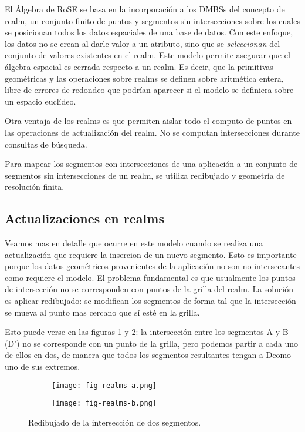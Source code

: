 El Álgebra de RoSE se basa en la incorporación a los DMBSs del concepto de realm, un conjunto finito de puntos y segmentos sin intersecciones
sobre los cuales se posicionan todos los datos espaciales de una base de datos.
Con este enfoque, los datos no se crean al darle valor a un atributo, sino que se \emph{seleccionan} del conjunto de
valores existentes en el realm.
Este modelo permite asegurar que el álgebra espacial es cerrada respecto a un realm.
Es decir, que la primitivas geométricas y las operaciones sobre realms se definen sobre
aritmética entera, libre de errores de redondeo que podrían aparecer si el modelo se definiera sobre un espacio euclídeo.

Otra ventaja de los realms es que permiten aislar todo el computo de puntos en las operaciones de actualización del realm.
No se computan intersecciones durante consultas de búsqueda.

Para mapear los segmentos con intersecciones de una aplicación a un conjunto de segmentos sin intersecciones de un realm,
se utiliza redibujado y geometría de resolución finita\textsuperscript{\cite{finite:resolution}}.

\subsection{Actualizaciones en realms} \label{realms:2}

Veamos mas en detalle que ocurre en este modelo cuando se realiza una actualización que requiere la insercion de un nuevo segmento.
Esto es importante porque los datos geométricos provenientes de la aplicación no son no-intersecantes como requiere el modelo.
El problema fundamental es que usualmente los puntos de intersección no se corresponden con puntos de la grilla del realm.
La solución es aplicar redibujado:
se modifican los segmentos de forma tal que la intersección se mueva al punto mas cercano que sí esté en la grilla.

Esto puede verse en las figuras \ref{fig:realms:redibu:a} y \ref{fig:realms:redibu:b}:
la intersección entre los segmentos A y B (D') no se corresponde con un punto de la grilla,
pero podemos partir a cada uno de ellos en dos, de manera que todos los segmentos resultantes tengan a Dcomo uno de sus extremos.

\begin{figure}
    \centering
    \begin{subfigure}[b]{0.3\textwidth}
        \texttt{[image: fig-realms-a.png]}
        \caption{}
        \label{fig:realms:redibu:a}
    \end{subfigure}
    \begin{subfigure}[b]{0.3\textwidth}
        \texttt{[image: fig-realms-b.png]}
        \caption{}
        \label{fig:realms:redibu:b}
    \end{subfigure}
    \caption{Redibujado de la intersección de dos segmentos.}
    \label{fig:realms:redibu}
\end{figure}

